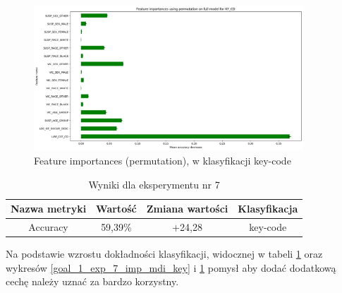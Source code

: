 \documentclass{classrep}
\begin{document}
{{{{                    \begin{figure}[!htbp]
                        \centering
                        \includegraphics[width=0.9\textwidth]{img/5.1.3/7/Feature importances using permutation on full model for KY_CD.png}
                        \caption{Feature importances (permutation), w klasyfikacji key-code}
                        \label{goal_1_exp_7_imp_perm_key}
                    \end{figure}
                    
                    \begin{table}
                    \centering
                     \begin{tabular}{|c|c|c|c|}
                            \hline
                          Nazwa metryki & Wartość & Zmiana wartości & Klasyfikacja \\ \hline
                            Accuracy &  59,39\% & +24,28 & key-code\\ \hline
                        \end{tabular}
                        \caption{Wyniki dla eksperymentu nr 7}
                        \label{goal_1_exp_7_results}
                     \end{table}
                     \FloatBarrier
                     Na podstawie wzrostu dokładności klasyfikacji, widocznej w tabeli \ref{goal_1_exp_7_results} oraz wykresów \ref{goal_1_exp_7_imp_mdi_key} i \ref{goal_1_exp_7_imp_perm_key} pomysł aby dodać dodatkową cechę należy uznać za bardzo korzystny.
                }
}}}
\end{document}
